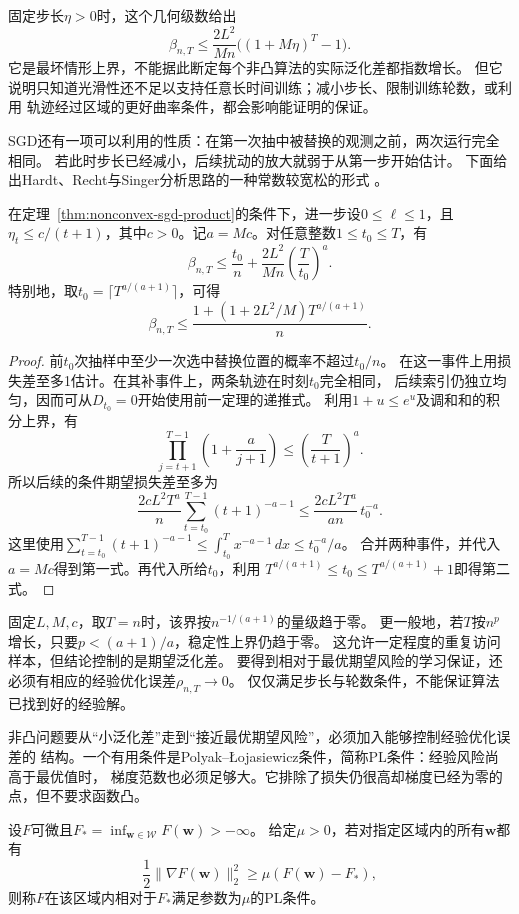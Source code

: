 固定步长$\eta>0$时，这个几何级数给出
\[
 \beta_{n,T}\leq\frac{2L^2}{Mn}\bigl((1+M\eta)^T-1\bigr).
\]
它是最坏情形上界，不能据此断定每个非凸算法的实际泛化差都指数增长。
但它说明只知道光滑性还不足以支持任意长时间训练；减小步长、限制训练轮数，或利用
轨迹经过区域的更好曲率条件，都会影响能证明的保证。

SGD还有一项可以利用的性质：在第一次抽中被替换的观测之前，两次运行完全相同。
若此时步长已经减小，后续扰动的放大就弱于从第一步开始估计。
下面给出Hardt、Recht与Singer分析思路的一种常数较宽松的形式
。

\begin{theorem}[递减步长的非凸SGD泛化界]
\label{thm:nonconvex-sgd-decay}
在定理~\ref{thm:nonconvex-sgd-product}的条件下，进一步设$0\leq\ell\leq1$，且
$\eta_t\leq c/(t+1)$，其中$c>0$。记$a=Mc$。对任意整数$1\leq t_0\leq T$，有
\[
 \beta_{n,T}\leq\frac{t_0}{n}
       +\frac{2L^2}{Mn}\left(\frac{T}{t_0}\right)^a.
\]
特别地，取$t_0=\lceil T^{a/(a+1)}\rceil$，可得
\[
 \beta_{n,T}\leq
 \frac{1+(1+2L^2/M)T^{a/(a+1)}}{n}.
\]
\end{theorem}
\begin{proof}
前$t_0$次抽样中至少一次选中替换位置的概率不超过$t_0/n$。
在这一事件上用损失差至多1估计。在其补事件上，两条轨迹在时刻$t_0$完全相同，
后续索引仍独立均匀，因而可从$D_{t_0}=0$开始使用前一定理的递推式。
利用$1+u\leq e^u$及调和和的积分上界，有
\[
 \prod_{j=t+1}^{T-1}\left(1+\frac a{j+1}\right)
 \leq\left(\frac T{t+1}\right)^a.
\]
所以后续的条件期望损失差至多为
\[
 \frac{2cL^2T^a}{n}\sum_{t=t_0}^{T-1}(t+1)^{-a-1}
 \leq\frac{2cL^2T^a}{an}\,t_0^{-a}.
\]
这里使用$\sum_{t=t_0}^{T-1}(t+1)^{-a-1}\leq\int_{t_0}^{T}x^{-a-1}\,dx\leq t_0^{-a}/a$。
合并两种事件，并代入$a=Mc$得到第一式。再代入所给$t_0$，利用
$T^{a/(a+1)}\leq t_0\leq T^{a/(a+1)}+1$即得第二式。
\end{proof}

固定$L,M,c$，取$T=n$时，该界按$n^{-1/(a+1)}$的量级趋于零。
更一般地，若$T$按$n^p$增长，只要$p<(a+1)/a$，稳定性上界仍趋于零。
这允许一定程度的重复访问样本，但结论控制的是期望泛化差。
要得到相对于最优期望风险的学习保证，还必须有相应的经验优化误差$\rho_{n,T}\to0$。
仅仅满足步长与轮数条件，不能保证算法已找到好的经验解。

非凸问题要从“小泛化差”走到“接近最优期望风险”，必须加入能够控制经验优化误差的
结构。一个有用条件是Polyak--\L{}ojasiewicz条件，简称PL条件：经验风险尚高于最优值时，
梯度范数也必须足够大。它排除了损失仍很高却梯度已经为零的点，但不要求函数凸。

\begin{definition}[PL条件]
\label{def:pl-condition}
设$F$可微且$F_* =\inf_{\bm w\in\mathcal W}F(\bm w)>-\infty$。
给定$\mu>0$，若对指定区域内的所有$\bm w$都有
\[
 \frac12\|\nabla F(\bm w)\|_2^2\geq\mu(F(\bm w)-F_*),
\]
则称$F$在该区域内相对于$F_*$满足参数为$\mu$的PL条件。
\end{definition}

